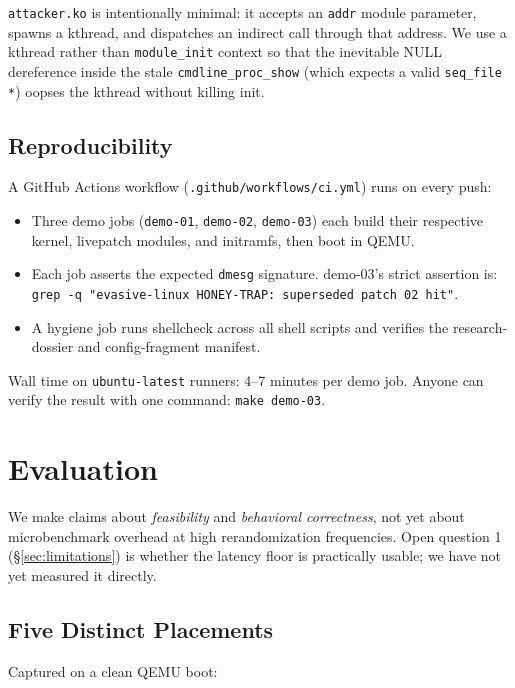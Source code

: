 \documentclass[10pt,letterpaper]{article}
\begin{document}
\texttt{attacker.ko} is intentionally minimal: it accepts an
\texttt{addr} module parameter, spawns a kthread, and dispatches an
indirect call through that address. We use a kthread rather than
\texttt{module\_init} context so that the inevitable NULL dereference
inside the stale \texttt{cmdline\_proc\_show} (which expects a valid
\texttt{seq\_file *}) oopses the kthread without killing init.

\subsection{Reproducibility}

A GitHub Actions workflow (\texttt{.github/workflows/ci.yml}) runs
on every push:

\begin{itemize}[leftmargin=*]
\item Three demo jobs (\texttt{demo-01}, \texttt{demo-02},
\texttt{demo-03}) each build their respective kernel, livepatch
modules, and initramfs, then boot in QEMU.
\item Each job asserts the expected \texttt{dmesg} signature.
demo-03's strict assertion is:
\texttt{grep -q "evasive-linux HONEY-TRAP: superseded patch 02 hit"}.
\item A hygiene job runs shellcheck across all shell scripts and
verifies the research-dossier and config-fragment manifest.
\end{itemize}

Wall time on \texttt{ubuntu-latest} runners: 4--7 minutes per demo
job. Anyone can verify the result with one command:
\texttt{make demo-03}.

\section{Evaluation}
\label{sec:eval}

We make claims about \emph{feasibility} and \emph{behavioral
correctness}, not yet about microbenchmark overhead at high
rerandomization frequencies. Open question 1
(\S\ref{sec:limitations}) is whether the latency floor is
practically usable; we have not yet measured it directly.

\subsection{Five Distinct Placements}

Captured on a clean QEMU boot:
\end{document}
